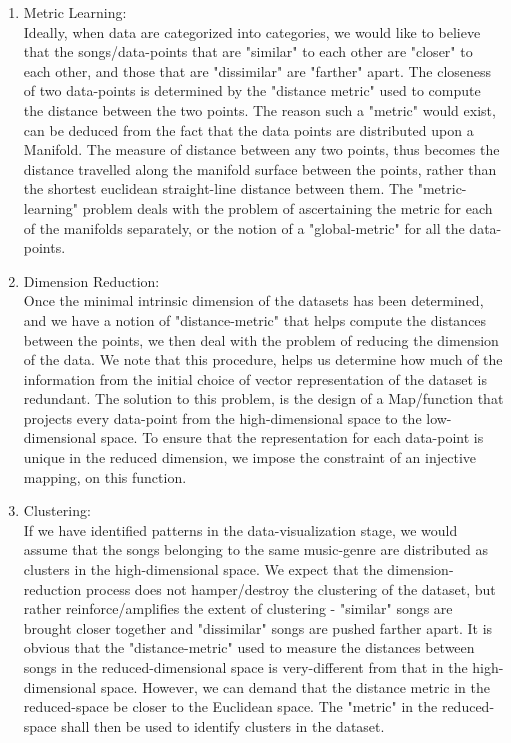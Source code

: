 \documentclass[10pt]{article}
\begin{document}
\begin{enumerate}
\item Metric Learning:\\
Ideally, when data are categorized into categories, we would like to believe that the songs/data-points that are "similar" to each other are "closer" to each other, and those that are "dissimilar" are "farther" apart. The closeness of two data-points is determined by the "distance metric" used to compute the distance between the two points. The reason such a "metric" would exist, can be deduced from the fact that the data points are distributed upon a Manifold. The measure of distance between any two points, thus becomes the distance travelled along the manifold surface between the points, rather than the shortest euclidean straight-line distance between them. The "metric-learning" problem deals with the problem of ascertaining the metric for each of the manifolds separately, or the notion of a "global-metric" for all the data-points.

\item Dimension Reduction:\\
Once the minimal intrinsic dimension of the datasets has been determined, and we have a notion of "distance-metric" that helps compute the distances between the points, we then deal with the problem of reducing the dimension of the data. We note that this procedure, helps us determine how much of the information from the initial choice of vector representation of the dataset is redundant. The solution to this problem, is the design of a Map/function that projects every data-point from the high-dimensional space to the low-dimensional space. To ensure that the representation for each data-point is unique in the reduced dimension, we impose the constraint of an injective mapping, on this function. 


\item Clustering:\\
If we have identified patterns in the data-visualization stage, we would assume that the songs belonging to the same music-genre are distributed as clusters in the high-dimensional space. We expect that the dimension-reduction process does not hamper/destroy the clustering of the dataset, but rather reinforce/amplifies the extent of clustering - "similar" songs are brought closer together and "dissimilar" songs are pushed farther apart. It is obvious that the "distance-metric" used to measure the distances between songs in the reduced-dimensional space is very-different from that in the high-dimensional space. However, we can demand that the distance metric in the reduced-space be closer to the Euclidean space. The "metric" in the reduced-space shall then be used to identify clusters in the dataset. 


\end{enumerate}
\end{document}
